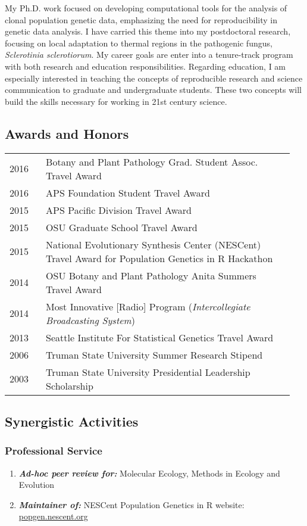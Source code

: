 \documentclass[12pt,letterpaper]{article}
\begin{document}
My Ph.D. work focused on developing computational tools for the analysis of clonal population genetic data, emphasizing the need for reproducibility in genetic data analysis. 
I have carried this theme into my postdoctoral research, focusing on local adaptation to thermal regions in the pathogenic fungus, \textit{Sclerotinia sclerotiorum}.
My career goals are enter into a tenure-track program with both research and education responsibilities.
Regarding education, I am especially interested in teaching the concepts of reproducible research and science communication to graduate and undergraduate students.
These two concepts will build the skills necessary for working in 21st century science.

\subsection*{Awards and Honors}

\begin{tabular}{p{0.125\linewidth}p{0.825\linewidth}}

2016 & Botany and Plant Pathology Grad. Student Assoc. Travel Award\\
2016 & APS Foundation Student Travel Award\\
2015 & APS Pacific Division Travel Award\\
2015 & OSU Graduate School Travel Award\\
2015 & National Evolutionary Synthesis Center (NESCent) Travel Award for Population Genetics in R Hackathon\\
2014 & OSU Botany and Plant Pathology Anita Summers Travel Award\\
2014 & Most Innovative [Radio] Program (\textit{Intercollegiate Broadcasting System})\\
2013 & Seattle Institute For Statistical Genetics Travel Award\\
2006 & Truman State University Summer Research Stipend\\
2003 & Truman State University Presidential Leadership Scholarship

\end{tabular}

\subsection*{Synergistic Activities}

\subsubsection*{Professional Service}
\begin{enumerate}
	
	\item \textit{\textbf{Ad-hoc peer review for:}} Molecular Ecology, Methods in Ecology and Evolution
	\item \textit{\textbf{Maintainer of:}} NESCent Population Genetics in R  website: 
                                 \href{http://popgen.nescent.org}{popgen.nescent.org}
\end{enumerate}
\end{document}
